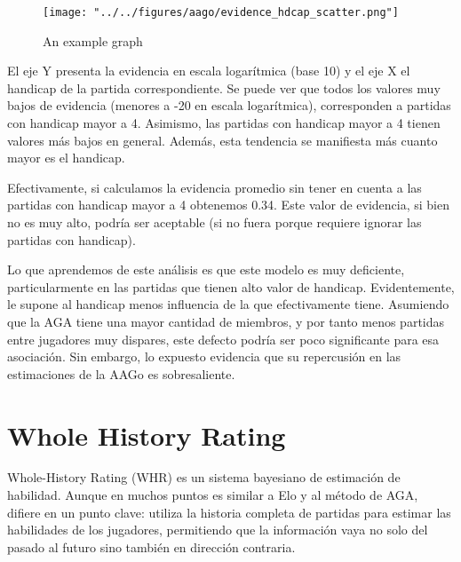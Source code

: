 \documentclass[a4paper,10pt]{report}
\begin{document}
\begin{figure}
	\centering
	\texttt{[image: "../../figures/aago/evidence\_hdcap\_scatter.png"]}
	\caption{An example graph}
	\label{fig:aago-hdcap}
\end{figure}

El eje Y presenta la evidencia en escala logarítmica (base 10) y el eje X el handicap de la partida correspondiente.
Se puede ver que todos los valores muy bajos de evidencia (menores a -20 en escala logarítmica), corresponden a partidas con handicap mayor a 4.
Asimismo, las partidas con handicap mayor a 4 tienen valores más bajos en general.
Además, esta tendencia se manifiesta más cuanto mayor es el handicap.

Efectivamente, si calculamos la evidencia promedio sin tener en cuenta a las partidas con handicap mayor a 4 obtenemos 0.34.
Este valor de evidencia, si bien no es muy alto, podría ser aceptable (si no fuera porque requiere ignorar las partidas con handicap).

Lo que aprendemos de este análisis es que este modelo es muy deficiente, particularmente en las partidas que tienen alto valor de handicap.
Evidentemente, le supone al handicap menos influencia de la que efectivamente tiene.
Asumiendo que la AGA tiene una mayor cantidad de miembros, y por tanto menos partidas entre jugadores muy dispares, este defecto podría ser poco significante para esa asociación.
Sin embargo, lo expuesto evidencia %
que su repercusión en las estimaciones de la AAGo es sobresaliente.




\section*{Whole History Rating}

Whole-History Rating (WHR)  es un sistema bayesiano de estimación de habilidad.
Aunque en muchos puntos es similar a Elo y al método de AGA, difiere en un punto clave: utiliza la historia completa de partidas para estimar las habilidades de los jugadores, permitiendo que la información vaya no solo del pasado al futuro sino también en dirección contraria.
\end{document}
